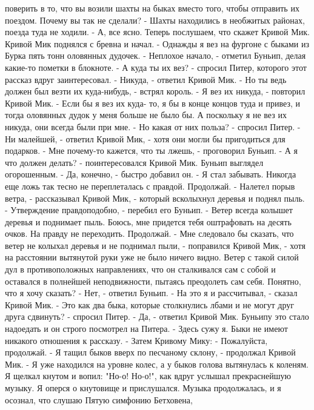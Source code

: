 поверить в то, что вы возили шахты на быках вместо того, чтобы 
отправить их поездом. Почему вы так не сделали?
    - Шахты находились в необжитых районах, поезда туда не ходили.
    - А, все ясно. Теперь послушаем, что скажет Кривой Мик.
    Кривой Мик поднялся с бревна и начал.
    - Однажды я вез на фургоне с быками из Бурка пять тонн оловянных 
дудочек.
    - Неплохое начало, - отметил Буньип, делая какие-то пометки в 
блокноте.
    - А куда ты их вез? - спросил Питер, которого этот рассказ вдруг 
заинтересовал.
    - Никуда, - ответил Кривой Мик.
    - Но ты ведь должен был везти их куда-нибудь, - встрял король.
    - Я вез их никуда, - повторил Кривой Мик. - Если бы я вез их куда-
то, я бы в конце концов туда и привез, и тогда оловянных дудок у меня 
больше не было бы. А поскольку я не вез их никуда, они всегда были при 
мне.
    - Но какая от них польза? - спросил Питер.
    - Ни малейшей, - ответил Кривой Мик, - хотя они могли бы 
пригодиться для подарков.
    - Мне почему-то кажется, что ты лжешь, - проговорил Буньип.
    - А я что должен делать? - поинтересовался Кривой Мик.
    Буньип выглядел огорошенным.
    - Да, конечно, - быстро добавил он. - Я стал забывать. Никогда еще 
ложь так тесно не переплеталась с правдой. Продолжай.
    - Налетел порыв ветра, - рассказывал Кривой Мик, - который 
всколыхнул деревья и поднял пыль.
    - Утверждение правдоподобно, - перебил его Буньип. - Ветер всегда 
колышет деревья и поднимает пыль. Боюсь, мне придется тебя оштрафовать 
на десять очков. На правду не переходить. Продолжай.
    - Мне следовало бы сказать, что ветер не колыхал деревья и не 
поднимал пыли, - поправился Кривой Мик, - хотя на расстоянии вытянутой 
руки уже не было ничего видно. Ветер с такой силой дул в 
противоположных направлениях, что он сталкивался сам с собой и 
оставался в полнейшей неподвижности, пытаясь преодолеть сам себя. 
Понятно, что я хочу сказать?
    - Нет, - ответил Буньип.
    - На это я и рассчитывал, - сказал Кривой Мик.
    - Это как два быка, которые столкнулись лбами и не могут друг 
друга сдвинуть? - спросил Питер.
    - Да, - ответил Кривой Мик.
    Буньипу это стало надоедать и он строго посмотрел на Питера.
    - Здесь сужу я. Быки не имеют никакого отношения к рассказу. - 
Затем Кривому Мику: - Пожалуйста, продолжай.
    - Я тащил быков вверх по песчаному склону, - продолжал Кривой Мик. 
- Я уже находился на уровне колес, а у быков голова вытянулась к 
коленям. Я щелкал кнутом и вопил: "Но-о! Но-о!", как вдруг услышал 
прекраснейшую музыку. Я оперся о кнутовище и прислушался. Музыка 
продолжалась, и я осознал, что слушаю Пятую симфонию Бетховена, 
